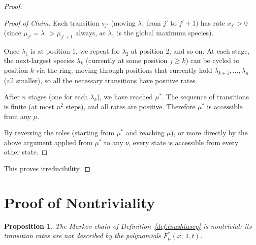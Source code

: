\documentclass[12pt]{article}
\newtheorem{proposition}[theorem]{Proposition}
\theoremstyle{definition}
\begin{document}
\begin{proof}
\begin{proof}[Proof of Claim]
Each transition $s_{j'}$ (moving $\lambda_1$ from $j'$ to $j'+1$) has rate
$x_{j'} > 0$ (since $\mu_{j'} = \lambda_1 > \mu_{j'+1}$ always, as $\lambda_1$
is the global maximum species).

Once $\lambda_1$ is at position $1$, we repeat for $\lambda_2$ at position $2$,
and so on.  At each stage, the next-largest species $\lambda_k$ (currently at
some position $j \geq k$) can be cycled to position $k$ via the ring, moving
through positions that currently hold $\lambda_{k+1}, \dots, \lambda_n$ (all
smaller), so all the necessary transitions have positive rates.

After $n$ stages (one for each $\lambda_k$), we have reached $\mu^*$.  The
sequence of transitions is finite (at most $n^2$ steps), and all rates are
positive.  Therefore $\mu^*$ is accessible from any $\mu$.

By reversing the roles (starting from $\mu^*$ and reaching $\mu$), or more
directly by the above argument applied from $\mu^*$ to any $\nu$, every state
is accessible from every other state.
\end{proof}

This proves irreducibility.
\end{proof}

\section{Proof of Nontriviality}\label{sec:nontrivial}

\begin{proposition}\label{prop:nontrivial}
The Markov chain of Definition~\ref{def:tpushtasep} is nontrivial: its
transition rates are not described by the polynomials $F^*_\mu(x;\,1,t)$.
\end{proposition}
\end{document}
